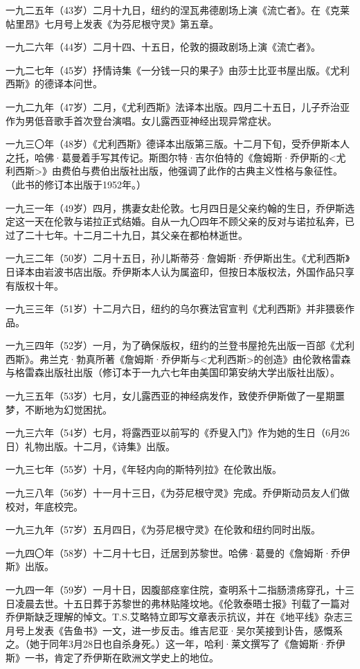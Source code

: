 \par 一九二五年（43岁）二月十九日，纽约的涅瓦弗德剧场上演《流亡者》。在《克莱帖里昂》七月号上发表《为芬尼根守灵》第五章。
\par 一九二六年（44岁）二月十四、十五日，伦敦的摄政剧场上演《流亡者》。
\par 一九二七年（45岁）抒情诗集《一分钱一只的果子》由莎士比亚书屋出版。《尤利西斯》的德译本问世。
\par 一九二九年（47岁）二月，《尤利西斯》法译本出版。四月二十五日，儿子乔治亚作为男低音歌手首次登台演唱。女儿露西亚神经出现异常症状。
\par 一九三〇年（48岁）《尤利西斯》德译本出版第三版。十二月下旬，受乔伊斯本人之托，哈佛·葛曼着手写其传记。斯图尔特·吉尔伯特的《詹姆斯·乔伊斯的<尤利西斯>》由费伯与费伯出版社出版，他强调了此作的古典主义性格与象征性。（此书的修订本出版于1952年。）
\par 一九三一年（49岁）四月，携妻女赴伦敦。七月四日是父亲约翰的生日，乔伊斯选定这一天在伦敦与诺拉正式结婚。自从一九〇四年不顾父亲的反对与诺拉私奔，已过了二十七年。十二月二十九日，其父亲在都柏林逝世。
\par 一九三二年（50岁）二月十五日，孙儿斯蒂芬·詹姆斯·乔伊斯出生。《尤利西斯》日译本由岩波书店出版。乔伊斯本人认为属盗印，但按日本版权法，外国作品只享有版权十年。
\par 一九三三年（51岁）十二月六日，纽约的乌尔赛法官宣判《尤利西斯》并非猥亵作品。
\par 一九三四年（52岁）一月，为了确保版权，纽约的兰登书屋抢先出版一百部《尤利西斯》。弗兰克·勃真所著《詹姆斯·乔伊斯与<尤利西斯>的创造》由伦敦格雷森与格雷森出版社出版（修订本于一九六七年由美国印第安纳大学出版社出版）。
\par 一九三五年（53岁）七月，女儿露西亚的神经病发作，致使乔伊斯做了一星期噩梦，不断地为幻觉困扰。
\par 一九三六年（54岁）七月，将露西亚以前写的《乔叟入门》作为她的生日（6月26日）礼物出版。十二月，《诗集》出版。
\par 一九三七年（55岁）十月，《年轻内向的斯特列拉》在伦敦出版。
\par 一九三八年（56岁）十一月十三日，《为芬尼根守灵》完成。乔伊斯动员友人们做校对，年底校完。
\par 一九三九年（57岁）五月四日，《为芬尼根守灵》在伦敦和纽约同时出版。
\par 一九四〇年（58岁）十二月十七日，迁居到苏黎世。哈佛·葛曼的《詹姆斯·乔伊斯》出版。
\par 一九四一年（59岁）一月十日，因腹部痉挛住院，查明系十二指肠溃疡穿孔，十三日凌晨去世。十五日葬于苏黎世的弗林贴隆坟地。《伦敦泰晤士报》刊载了一篇对乔伊斯缺乏理解的悼文。T.S.艾略特立即写文章表示抗议，并在《地平线》杂志三月号上发表《告鱼书》一文，进一步反击。维吉尼亚·吴尔芙接到讣告，感慨系之。（她于同年3月28日也自杀身死。）这一年，哈利·莱文撰写了《詹姆斯·乔伊斯》一书，肯定了乔伊斯在欧洲文学史上的地位。
